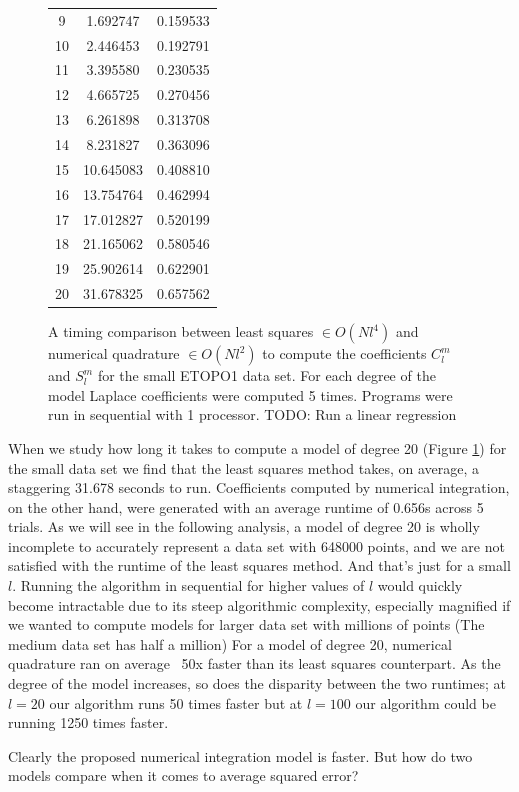 \documentclass[a4paper]{article}
\theoremstyle{definition}
\begin{document}
\begin{figure}[h!]
\begin{minipage}{0.28\linewidth}
\begin{tabular}{c | c c}
    9 & 1.692747 & 0.159533 \\
    10 & 2.446453 & 0.192791 \\
    11 & 3.395580 & 0.230535 \\
    12 & 4.665725 & 0.270456 \\
    13 & 6.261898 & 0.313708 \\
    14 & 8.231827 & 0.363096 \\
    15 & 10.645083 & 0.408810 \\
    16 & 13.754764 & 0.462994 \\
    17 & 17.012827 & 0.520199 \\
    18 & 21.165062 & 0.580546 \\
    19 & 25.902614 & 0.622901 \\
    20 & 31.678325 & 0.657562
\end{tabular}
\end{minipage}
\caption{A timing comparison between least squares $\in O(Nl^4)$ and numerical quadrature $\in O(Nl^2)$ to compute the coefficients $C_l^m$ and $S_l^m$ for the small ETOPO1 data set. 
For each degree of the model Laplace coefficients were computed 5 times. Programs were run in sequential with 1 processor. TODO: Run a linear regression}
\label{fig:runtime}
\end{figure}


When we study how long it takes to compute a model of degree 20 (Figure \ref{fig:runtime}) for the small data set we find that the least squares method takes, on average, a staggering 31.678 seconds to run. 
Coefficients computed by numerical integration, on the other hand, were generated with an average runtime of 0.656s across
5 trials. As we will see in the following analysis, a model of degree 20 is wholly incomplete to accurately represent a data set with 648000 points, and we are not 
satisfied with the runtime of the least squares method. And that's just for a small $l$. Running the algorithm in sequential for higher values of $l$ would quickly become
intractable due to its steep algorithmic complexity, especially magnified if we wanted to compute models for larger data set with millions of points (The medium data set has half a million) For a model of degree 20, numerical quadrature ran on average ~50x faster than its least squares counterpart. As the degree
of the model increases, so does the disparity between the two runtimes; at $l=20$ our algorithm runs 50 times faster but at $l = 100$ our algorithm could be running 1250 times faster.

Clearly the proposed numerical integration model is faster. But how do two models compare when it comes to average squared error? 
\end{document}
